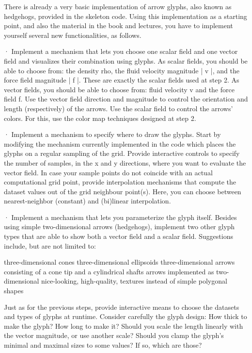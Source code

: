 There is already a very basic implementation of arrow glyphs, also known as hedgehogs, provided in the skeleton code. Using this implementation as a starting point, and also the material in the book and lectures, you have to implement yourself several new functionalities, as follows.
 
·        Implement a mechanism that lets you choose one scalar field and one vector field and visualizes their combination using glyphs. As scalar fields, you should be able to choose from: the density rho, the fluid velocity magnitude | v |, and the force field magnitude | f |. These are exactly the scalar fields used at step 2. As vector fields, you should be able to choose from: fluid velocity v and the force field f. Use the vector field direction and magnitude to control the orientation and length (respectively) of the arrows. Use the scalar field to control the arrows’ colors. For this, use the color map techniques designed at step 2.
 
·        Implement a mechanism to specify where to draw the glyphs. Start by modifying the mechanism currently implemented in the code which places the glyphs on a regular sampling of the grid. Provide interactive controls to specify the number of samples, in the x and y directions, where you want to evaluate the vector field. In case your sample points do not coincide with an actual computational grid point, provide interpolation mechanisms that compute the dataset values out of the grid neighbour point(s). Here, you can choose between nearest-neighbor (constant) and (bi)linear interpolation.
 
·        Implement a mechanism that lets you parameterize the glyph itself. Besides using simple two-dimensional arrows (hedgehogs), implement two other glyph types that are able to show both a vector field and a scalar field. Suggestions include, but are not limited to:
 
three-dimensional cones
three-dimensional ellipsoids
three-dimensional arrows consisting of a cone tip and a cylindrical shafts
arrows implemented as two-dimensional nice-looking, high-quality, textures instead of simple polygonal shapes
 
Just as for the previous steps, provide interactive means to choose the datasets and types of glyphs at runtime. Consider carefully the glyph design: How thick to make the glyph? How long to make it? Should you scale the length linearly with the vector magnitude, or use another scale? Should you clamp the glyph’s minimal and maximal sizes to some values? If so, which are those?

